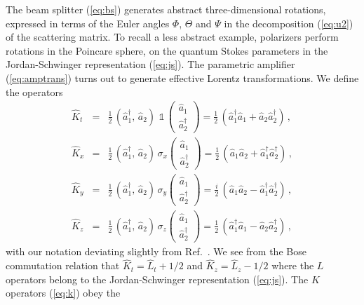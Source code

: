 \documentclass[12pt,amsmath,amssymb]{article}
\numberwithin{equation}{section}
\begin{document}
The beam splitter (\ref{eq:bs}) generates abstract
three-dimensional rotations, expressed in terms of the Euler
angles $\Phi$, $\Theta$ and $\Psi$ in the decomposition
(\ref{eq:u2}) of the scattering matrix. To recall a less abstract
example, polarizers perform rotations in the Poincare sphere, on
the quantum Stokes parameters in the Jordan-Schwinger
representation (\ref{eq:js}). The parametric amplifier
(\ref{eq:amptrans}) turns out to generate effective Lorentz
transformations. We define the operators \cite{YMK}
\begin{eqnarray}
\hat{K}_t &=& \frac{1}{2}\, (\hat{a}_1^\dagger,\, \hat{a}_2)\,\,
\mathds{1}\, \left(
    \begin{array}{c}
     \hat{a}_1  \\
     \hat{a}_2^\dagger
    \end{array}
\right) = \frac{1}{2}\,\left(\hat{a}_1^\dagger\hat{a}_1 +
\hat{a}_2\hat{a}_2^\dagger\right)\,, \nonumber\\
\hat{K}_x &=& \frac{1}{2}\, (\hat{a}_1^\dagger,\, \hat{a}_2)\,
\sigma_x \left(
    \begin{array}{c}
     \hat{a}_1  \\
     \hat{a}_2^\dagger
    \end{array}
\right) = \frac{1}{2}\,\left(\hat{a}_1\hat{a}_2 +
\hat{a}_1^\dagger\hat{a}_2^\dagger\right)\,, \nonumber\\
\hat{K}_y &=& \frac{1}{2}\, (\hat{a}_1^\dagger,\, \hat{a}_2)\,
\sigma_y \left(
    \begin{array}{c}
     \hat{a}_1  \\
     \hat{a}_2^\dagger
    \end{array}
\right) = \frac{i}{2}\,\left(\hat{a}_1\hat{a}_2 -
\hat{a}_1^\dagger\hat{a}_2^\dagger\right)\,, \nonumber\\
\hat{K}_z &=& \frac{1}{2}\, (\hat{a}_1^\dagger,\, \hat{a}_2)\,
\sigma_z \left(
    \begin{array}{c}
     \hat{a}_1  \\
     \hat{a}_2^\dagger
    \end{array}
\right) = \frac{1}{2}\,\left(\hat{a}_1^\dagger\hat{a}_1 -
\hat{a}_2\hat{a}_2^\dagger\right)\,,
\label{eq:k}
\end{eqnarray}
with our notation deviating slightly from Ref.\ \cite{YMK}. We
see from the Bose commutation relation that
$\hat{K}_t=\hat{L}_t+1/2$ and $\hat{K}_z=\hat{L}_z-1/2$ where the
$L$ operators belong to the Jordan-Schwinger representation
(\ref{eq:js}). The $K$ operators (\ref{eq:k}) obey the
\end{document}

